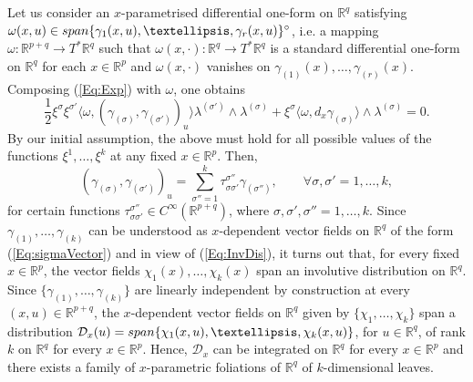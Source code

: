 \documentclass{birkjour}
\theoremstyle{definition}
\theoremstyle{remark}
\numberwithin{equation}{section}
\numberwithin{equation}{section}
\numberwithin{thm}{section}
\numberwithin{equation}{section}
\numberwithin{thm}{section}
\begin{document}
Let us consider an $x$-parametrised differential one-form on $\mathbb{R}^q$ satisfying $\omega(x,u)\in {\rm span}\{ \gamma_1(x,u),\ldots,\gamma_r(x,u)\}^\circ$, i.e. a mapping $\omega:\mathbb{R}^{p+q}\rightarrow T^*\mathbb{R}^q$ such that $\omega(x,\cdot):\mathbb{R}^q\rightarrow T^*\mathbb{R}^q$ is a standard differential one-form on $\mathbb{R}^q$ for each $x\in \mathbb{R}^p$ and $\omega(x,\cdot)$ vanishes on $\gamma_{(1)}(x),\ldots,\gamma_{(r)}(x)$.  Composing (\ref{Eq:Exp}) with $\omega$, one obtains
\begin{equation}\label{Eq:In}
	\frac 12\xi^{\sigma}\xi^{\sigma'}\langle \omega,(\gamma_{(\sigma)},\gamma_{(\sigma')})_u\rangle \lambda^{(\sigma')}\wedge \lambda^{(\sigma)}+\xi^\sigma\langle \omega,d_x\gamma_{(\sigma)}\rangle\wedge \lambda^{(\sigma)}=0.
\end{equation}
By our initial assumption, the above must hold for all possible values of the functions $\xi^1,\ldots,\xi^k$ at any fixed $x\in \mathbb{R}^p$. Then,
\begin{equation}\label{Eq:InvDis}
	(\gamma_{(\sigma)},\gamma_{(\sigma')})_u=\sum_{\sigma''=1}^k\tau^{\sigma''}_{\sigma \sigma'}\gamma_{(\sigma'')},\qquad \forall \sigma,\sigma'=1,\ldots,k,
\end{equation}
for certain functions $\tau^{\sigma''}_{\sigma \sigma'}\in C^\infty(\mathbb{R}^{p+q})$, where $\sigma,\sigma',\sigma''=1,\ldots,k$. Since   $\gamma_{(1)},\ldots,\gamma_{(k)}$ can be understood as $x$-dependent vector fields on $\mathbb{R}^q$ of the form (\ref{Eq:sigmaVector})
and in view of (\ref{Eq:InvDis}), it turns out that, for every fixed $x\in \mathbb{R}^p$, the vector fields $\chi_1(x),\ldots,\chi_k(x)$ span an involutive distribution on $\mathbb{R}^q$. Since $\{\gamma_{(1)},\ldots,\gamma_{(k)}\}$ are linearly independent by construction at every $(x,u)\in \mathbb{R}^{p+q}$, the $x$-dependent vector fields on $\mathbb{R}^{q}$ given by $\{\chi_1,\ldots,\chi_k\}$ span a distribution $\mathcal{D}_x(u)={\rm span}\{ \chi_1(x,u),\ldots,\chi_k(x,u)\}$, for $u\in \mathbb{R}^q$, of rank $k$ on $\mathbb{R}^q$ for every $x\in \mathbb{R}^p$. Hence, $\mathcal{D}_x$ can be integrated on $\mathbb{R}^q$ for every $x\in \mathbb{R}^p$ and there exists a family of $x$-parametric foliations of $\mathbb{R}^q$ of $k$-dimensional leaves. %
\end{document}
